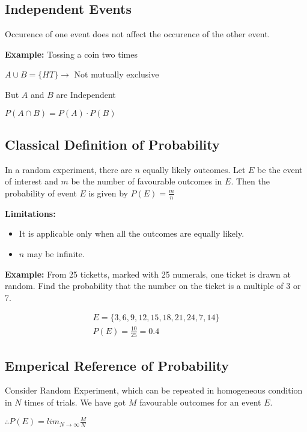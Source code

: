 \documentclass[english,course]{lecture}
\begin{document}
\subsection{Independent Events}

Occurence of one event does not affect the occurence of the other event.

\textbf{Example:} Tossing a coin two times

$A \cup B = \{HT\} \rightarrow$ Not mutually exclusive

But $A$ and $B$ are Independent

$P(A \cap B) = P(A) \cdot P(B)$


\subsection{Classical Definition of Probability}

In a random experiment, there are $n$ equally likely outcomes.
Let $E$ be the event of interest and $m$ be the number of favourable outcomes in $E$.
Then the probability of event $E$ is given by $P(E) = \frac{m}{n}$

\textbf{Limitations:} 
\begin{itemize}
  \item It is applicable only when all the outcomes are equally likely. 
    \item $n$ may be infinite.
\end{itemize}

\textbf{Example: }
From 25 ticketts, marked with 25 numerals, one ticket is drawn at random. Find the probability that the number on the ticket is a multiple of 3 or 7.


\begin{gather*}
  E = \{3, 6, 9, 12, 15, 18, 21, 24, 7, 14\}\\
  P(E) = \frac{10}{25} = 0.4
\end{gather*}

\subsection{Emperical Reference of Probability}

Consider Random Experiment, which can be repeated in homogeneous condition in $N$ times of trials.
We have got $M$ favourable outcomes for an event $E$.

$\therefore P(E) = {lim}_{N \to \infty}\frac{M}{N} $

\\
\end{document}
